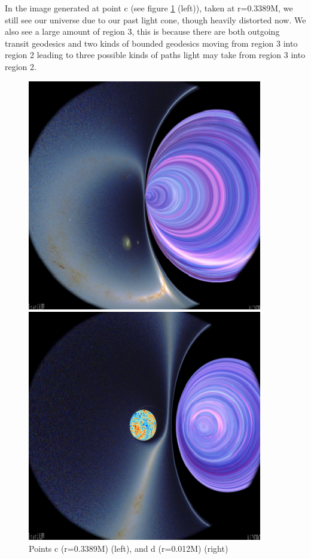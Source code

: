 \documentclass[oneside,openright,frontopenright, singlespacing]{dmathesis}
\begin{document}
\vspace{1em}
	In the image generated at point c (see figure \ref{fig:Figure6.4} (left)), taken at r=0.3389M, we still see our universe due to our past light cone, though heavily distorted now. We also see a large amount of region 3, this is because there are both outgoing transit geodesics and two kinds of bounded geodesics moving from region 3 into region 2 leading to three possible kinds of paths light may take from region 3 into region 2.

\vspace{1em}
\begin{figure}[!ht]
	\centering
	\begin{minipage}{0.5\textwidth}
		\centering
		\includegraphics[width=0.7\linewidth]{img/plunging3}
	\end{minipage}%
	\hfill
	\begin{minipage}{0.5\textwidth}
		\centering
		\includegraphics[width=0.7\linewidth]{img/plunging4}
	\end{minipage}
	\caption{Points c (r=0.3389M) (left), and d (r=0.012M) (right)}
	\label{fig:Figure6.4}
\end{figure}
\end{document}

